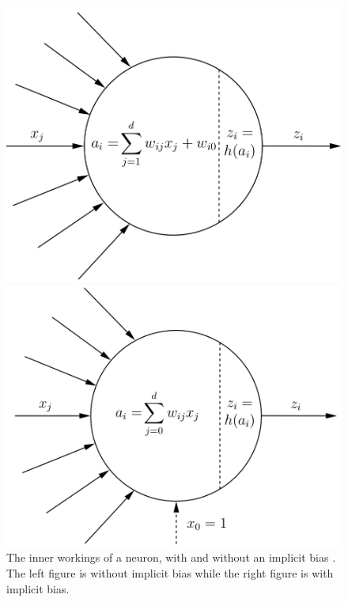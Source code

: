 \begin{figure}[!tbp]
  \centering
  \begin{minipage}[b]{0.45\textwidth}
    \includegraphics[width=\textwidth]{./pictures/method/neuron.png}
  \end{minipage}
  \hfill
  \begin{minipage}[b]{0.45\textwidth}
    \includegraphics[width=\textwidth]{./pictures/method/neuron_bias.png}
  \end{minipage}
    \caption{The inner workings of a neuron, with and without an implicit
        bias \citep{Igel}. The left figure is without implicit bias while the
        right figure is with implicit bias.}
\label{fig:neuron}
\end{figure}

